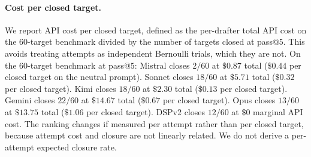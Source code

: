 \begin{table}[!t]
\centering
\small
\caption{Drafter sweep latency and cost profile on the
$60$-target benchmark. Attempt counts include duplicate runs after a
tokenizer fix. Per-attempt cost uses $T=0$ greedy plus $T=0.7$
samples at list prices. Total API-priced cost across the five
closed-source drafters is $\$37.30$. DSPv2 and Goedel-V2 run
locally with no API cost. Token counts are approximate.}
\label{tab:cost}

\end{table}

\paragraph{Cost per closed target.}
We report API cost per closed target, defined as the
per-drafter total API cost on the $60$-target benchmark divided by the
number of targets closed at pass@$5$. This avoids treating
attempts as independent Bernoulli trials, which they are not.
On the $60$-target benchmark at pass@$5$: Mistral closes $2/60$ at
$\$0.87$ total ($\$0.44$ per closed target on the neutral
prompt). Sonnet closes $18/60$ at $\$5.71$ total ($\$0.32$
per closed target). Kimi closes $18/60$ at $\$2.30$ total
($\$0.13$ per closed target). Gemini closes $22/60$ at
$\$14.67$ total ($\$0.67$ per closed target). Opus closes
$13/60$ at $\$13.75$ total ($\$1.06$ per closed target).
DSPv2 closes $12/60$ at $\$0$ marginal API cost. The ranking changes if measured
per attempt rather than per closed target, because attempt
cost and closure are not linearly related. We do not derive a
per-attempt expected closure rate.

